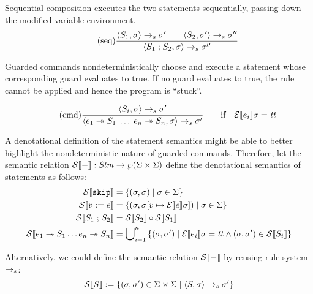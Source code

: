 \documentclass{article}
\begin{document}
Sequential composition executes the two statements sequentially, passing down the modified variable environment.
\begin{equation*}
	\tag{seq}
	\dfrac
	{
		\langle S_1, \sigma \rangle
			\rightarrow_s
		\sigma'
		\qquad
		\langle S_2, \sigma' \rangle
			\rightarrow_s
		\sigma''
	}
	{
		\langle S_1 \; \mathtt{;} \; S_2, \sigma \rangle
			\rightarrow_s
		\sigma''
	}
\end{equation*}

Guarded commands nondeterministically choose and execute a statement whose corresponding guard evaluates to true. If no guard
evaluates to true, the rule cannot be applied and hence the program is ``stuck''.

\begin{equation*}
	\tag{cmd}
	\dfrac
	{
		\langle S_i, \sigma \rangle
			\rightarrow_s
		\sigma'
	}
	{
		\langle e_1 \; \mathtt{\twoheadrightarrow} \; S_1 \; \ldots \; e_n \; \mathtt{\twoheadrightarrow} \; S_n, \sigma \rangle
			\rightarrow_s
		\sigma'
	}
	\qquad \text{if} \quad \mathcal{E} \llbracket e_i \rrbracket \sigma = \mathit{tt}
\end{equation*}

A denotational definition of the statement semantics might be able to better highlight the nondeterministic nature of guarded
commands. Therefore, let the semantic relation $\mathcal{S} \llbracket - \rrbracket : \mathit{Stm} \rightarrow \wp (\Sigma \times \Sigma)$ define the
denotational semantics of statements as follows:
\begin{align*}
	\mathcal{S} \llbracket \mathtt{skip} \rrbracket &= \{ (\sigma, \sigma) \mid \sigma \in \Sigma \}
	\\
	\mathcal{S} \llbracket v\; \mathtt{:=}\; e \rrbracket &= \{ (\sigma, \sigma[v \mapsto \mathcal{E} \llbracket e \rrbracket \sigma]) \mid \sigma \in \Sigma \}
	\\
	\mathcal{S} \llbracket S_1 \; \mathtt{;} \; S_2 \rrbracket &= \mathcal{S} \llbracket S_2 \rrbracket \circ \mathcal{S} \llbracket S_1 \rrbracket
	\\
	\mathcal{S} \llbracket e_1 \; \mathtt{\twoheadrightarrow} \; S_1 \ldots e_n \; \mathtt{\twoheadrightarrow} \; S_n \rrbracket &= 
		\bigcup\nolimits_{i = 1}^n 
		{\{ (\sigma, \sigma') \mid \mathcal{E} \llbracket e_i \rrbracket \sigma = \mathit{tt} \wedge (\sigma, \sigma') \in \mathcal{S} \llbracket S_i \rrbracket \}}
\end{align*}

Alternatively, we could define the semantic relation $\mathcal{S} \llbracket - \rrbracket$ by reusing rule system $\rightarrow_s$:
\begin{equation*}
	\mathcal{S} \llbracket S \rrbracket := \{ (\sigma, \sigma') \in \Sigma \times \Sigma \mid \langle S, \sigma \rangle \rightarrow_s \sigma' \}
\end{equation*}
\end{document}
